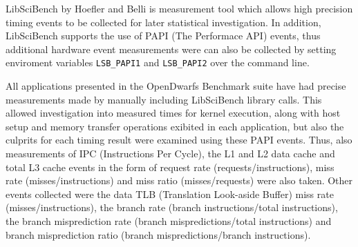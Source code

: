 \documentclass[../document.tex]{subfiles}
\begin{document}
\label{ssec:time}

LibSciBench by Hoefler and Belli \cite{hoefler2015scientific} is measurement
tool which allows high precision timing events to be collected for later
statistical investigation. In addition, LibSciBench supports the use of
PAPI (The Performace API) \cite{mucci1999papi} events, thus additional
hardware event measurements were can also be collected by setting enviroment
variables {\tt LSB\_PAPI1} and {\tt LSB\_PAPI2} over the command line.

All applications presented in the OpenDwarfs Benchmark suite have had precise
measurements made by manually including LibSciBench library calls. This allowed
investigation into measured times for kernel execution, along with host setup
and memory transfer operations exibited in each application, but also the
culprits for each timing result were examined using these PAPI events. Thus,
also measurements of IPC (Instructions Per Cycle), the L1 and L2 data cache
and total L3 cache events in the form of request rate (requests/instructions),
miss rate (misses/instructions) and miss ratio (misses/requests) were also
taken. Other events collected were the data TLB (Translation Look-aside Buffer)
miss rate (misses/instructions), the branch rate (branch instructions/total
instructions), the branch misprediction rate (branch mispredictions/total
instructions) and branch misprediction ratio (branch mispredictions/branch
instructions).
\end{document}
